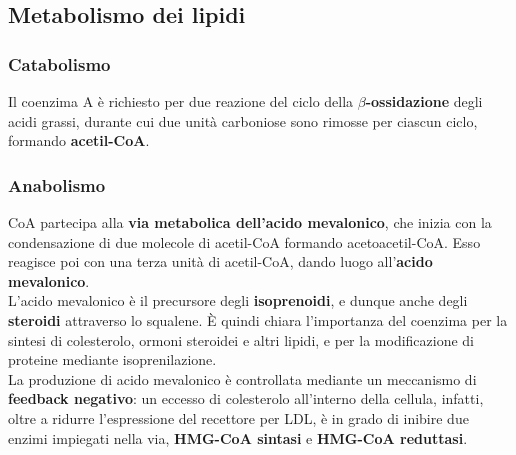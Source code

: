 \documentclass[a4paper, 12pt]{article}
\begin{document}
\subsection{Metabolismo dei lipidi}
\subsubsection{Catabolismo}
Il coenzima A è richiesto per due reazione del ciclo della \textbf{$\beta$-ossidazione} degli acidi grassi, durante cui due unità carboniose sono rimosse per ciascun ciclo, formando \textbf{acetil-CoA}.
\subsubsection{Anabolismo}
CoA partecipa alla \textbf{via metabolica dell'acido mevalonico}, che inizia con la condensazione di due molecole di acetil-CoA formando acetoacetil-CoA. Esso reagisce poi con una terza unità di acetil-CoA, dando luogo all'\textbf{acido mevalonico}.\\
L'acido mevalonico è il precursore degli \textbf{isoprenoidi}, e dunque anche degli \textbf{steroidi} attraverso lo squalene.
È quindi chiara l'importanza del coenzima per la sintesi di colesterolo, ormoni steroidei e altri lipidi, e per la modificazione di proteine mediante isoprenilazione. \\
La produzione di acido mevalonico è controllata mediante un meccanismo di \textbf{feedback negativo}: un eccesso di colesterolo all'interno della cellula, infatti, oltre a ridurre l'espressione del recettore per LDL, è in grado di inibire due enzimi impiegati nella via, \textbf{HMG-CoA sintasi} e \textbf{HMG-CoA reduttasi}.

\begin{center}
\end{center}
\end{document}
